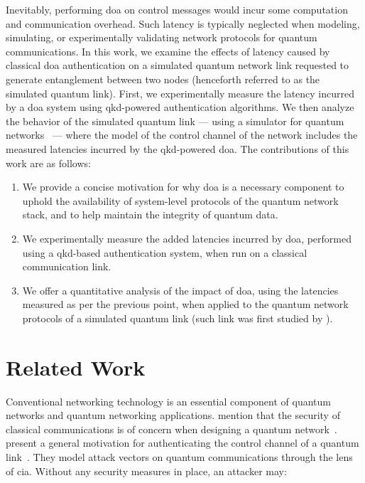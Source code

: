 Inevitably, performing \acrshort{doa} on control messages would incur some computation and
communication overhead. Such latency is typically neglected when modeling, simulating, or
experimentally validating network protocols for quantum communications. In this work, we examine the
effects of latency caused by classical \acrshort{doa} authentication on a simulated quantum network
link requested to generate entanglement between two nodes (henceforth referred to as the simulated
quantum link). First, we experimentally measure the latency incurred by a \acrshort{doa} system
using \acrshort{qkd}-powered authentication algorithms. We then analyze the behavior of the
simulated quantum link --- using a simulator for quantum networks~\cite{coopmans_2021_netsquid} ---
where the model of the control channel of the network includes the measured latencies incurred by
the \acrshort{qkd}-powered \acrshort{doa}. The contributions of this work are as follows:

\begin{enumerate}
    \item We provide a concise motivation for why \acrshort{doa} is a necessary component to uphold
          the availability of system-level protocols of the quantum network stack, and to help
          maintain the integrity of quantum data.
    \item We experimentally measure the added latencies incurred by \acrshort{doa}, performed using
          a \acrshort{qkd}-based authentication system, when run on a classical communication link.
    \item We offer a quantitative analysis of the impact of \acrshort{doa}, using the latencies
          measured as per the previous point, when applied to the quantum network protocols of a
          simulated quantum link (such link was first studied by \textcite{dahlberg_2019_egp}).
\end{enumerate}

\section{Related Work}
\label{sec:doa:relwork}

Conventional networking technology is an essential component of quantum networks and quantum
networking applications. \citeauthor{kozlowski_2019_towards} mention that the security of classical
communications is of concern when designing a quantum network~\cite{kozlowski_2019_towards}.
\citeauthor{satoh_2020_attacking} present a general motivation for authenticating the control
channel of a quantum link~\cite{satoh_2020_attacking}. They model attack vectors on quantum
communications through the lens of \acrfull{cia}. Without any security measures in place, an
attacker may:

